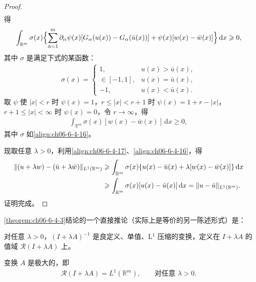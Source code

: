 \documentclass[../../main.tex]{subfiles}
\begin{document}
\begin{proof}
\begin{align}
\label{align:ch06-6-4-14}
\end{align}
得
\begin{align}
\int_{\mathbb{R}^{m}}\sigma(x)\Bigl{\{}\sum_{\alpha=1}^{m}\partial_{\alpha}\psi(x)[G_{\alpha}(u(x))-G_{\alpha}(\bar{u}(x))]+\psi(x)[w(x)-\bar{w}(x)]\Bigr{\}}\,\mathrm{d}x\geqslant 0,
\label{align:ch06-6-4-15}
\end{align}
其中 $\sigma$ 是满足下式的某函数：
\begin{align}
\sigma(x)=
\begin{cases}
1, & u(x)>\bar{u}(x),\\
\in[-1,1], & u(x)=\bar{u}(x),\\
-1, & u(x)<\bar{u}(x).
\end{cases}
\label{align:ch06-6-4-16}
\end{align}
取 $\psi$ 使 $|x|<r$ 时 $\psi(x)=1$，$r\leqslant|x|<r+1$ 时 $\psi(x)=1+r-|x|$，$r+1\leqslant|x|<\infty$ 时 $\psi(x)=0$，令 $r\to\infty$，得
\begin{align}
\int_{\mathbb{R}^{m}}\sigma(x)[w(x)-\bar{w}(x)]\,\mathrm{d}x\geqslant 0,
\label{align:ch06-6-4-17}
\end{align}
其中 $\sigma$ 如\eqref{align:ch06-6-4-16}。

现取任意 $\lambda>0$，利用\eqref{align:ch06-6-4-17}、\eqref{align:ch06-6-4-16}，得
\begin{align}
\|(u+\lambda w)-(\bar{u}+\lambda\bar{w})\|_{L^{1}(\mathbb{R}^{m})}
&\geqslant\int_{\mathbb{R}^{m}}\sigma(x)\{u(x)-\bar{u}(x)+\lambda[w(x)-\bar{w}(x)]\}\,\mathrm{d}x\notag\\
&\geqslant\int_{\mathbb{R}^{m}}\sigma(x)[u(x)-\bar{u}(x)]\,\mathrm{d}x=\|u-\bar{u}\|_{L^{1}(\mathbb{R}^{m})}.
\label{align:ch06-6-4-18}
\end{align}
证明完成。
\end{proof}

\cref{theorem:ch06-6-4-3}结论的一个直接推论（实际上是等价的另一陈述形式）是：

\begin{corollary}\label{corollary:ch06-6-4-4}
对任意 $\lambda>0$，$(I+\lambda A)^{-1}$ 是良定义、单值、L$^{1}$ 压缩的变换，定义在 $I+\lambda A$ 的值域 $\mathscr{R}(I+\lambda A)$ 上。
\end{corollary}

\begin{theorem}\label{theorem:ch06-6-4-5}
变换 $A$ 是极大的，即
\begin{align}
\mathscr{R}(I+\lambda A)=L^{1}(\mathbb{R}^{m}),\qquad\text{对任意 }\lambda>0.
\label{align:ch06-6-4-19}
\end{align}
\end{theorem}
\end{document}
